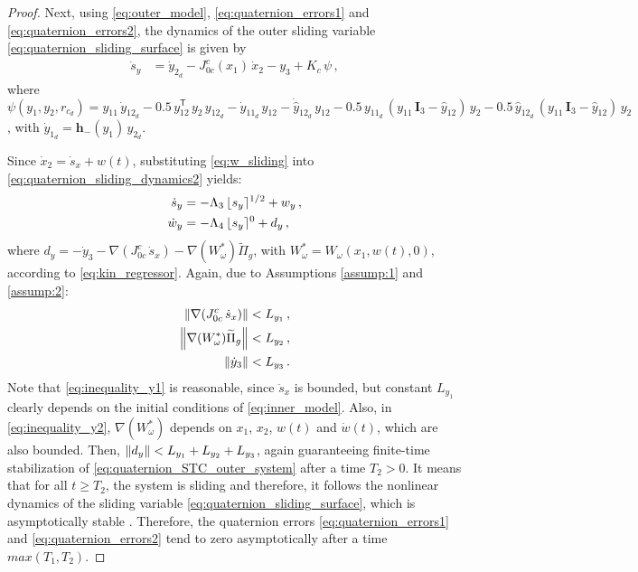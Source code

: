 \begin{proof}
Next, using \eqref{eq:outer_model}, \eqref{eq:quaternion_errors1} and \eqref{eq:quaternion_errors2}, the dynamics of the outer sliding variable \eqref{eq:quaternion_sliding_surface} is given by
%
\begin{align}
\dot{s}_{y} &= \dot{y}_{2_d} - J^{c}_{0c}(x_1) \, \dot{x}_2 - y_3 + K_{c} \, \psi \,,
\label{eq:quaternion_sliding_dynamics2}
\end{align}
%
where $\psi(y_1,y_2,r_{c_d}) = y_{11} \, \dot{y}_{12_d} - 0.5 \, y^\mathsf{T}_{12} \, y_{2} \, y_{12_d} - \dot{y}_{11_d} \, y_{12} - \dot{\widehat{y}}_{12_d} \, y_{12} - 0.5 \, y_{11_d} \, ( y_{11} \, \mathbf{I}_{3} - \widehat{y}_{12} ) \, y_{2} - 0.5 \, \widehat{y}_{12_d} \, ( y_{11} \, \mathbf{I}_{3} - \widehat{y}_{12} ) \, y_{2}$, 
with $\dot{y}_{1_d} = \mathbf{h}_-(y_1) \, y_{2_d}$.

Since $\dot{x}_2 = \dot{s}_x + w(t)$, substituting \eqref{eq:w_sliding} into \eqref{eq:quaternion_sliding_dynamics2} yields:
%
\begin{align}
\dot{s}_y &= - \Lambda_3 \, \lfloor s_y \rceil^{1/2} + w_y \,, \nonumber \\
\dot{w}_y &= - \Lambda_4 \, \lfloor s_y \rceil^{0} + d_y \,,
\label{eq:quaternion_STC_outer_system}
\end{align}
%
where $d_y = - \dot{y}_3 - \nabla( J^c_{0c} \, \dot{s}_x ) - \nabla( W^*_\omega ) \widetilde{\Pi}_g$, with $W^*_\omega = W_\omega (x_1, w(t), 0)$, according to \eqref{eq:kin_regressor}.
%
Again, due to Assumptions \ref{assump:1} and \ref{assump:2}:
%
\begin{align}
\left\lVert \nabla( J^c_{0c} \, \dot{s}_x ) \right\rVert &< L_{y_1} \,, \label{eq:inequality_y1} \\
\left\lVert \nabla( W^*_\omega ) \widetilde{\Pi}_g \right\rVert &< L_{y_2} \,, \label{eq:inequality_y2} \\
\left\lVert \dot{y}_3 \right\rVert &< L_{y_3} \label{eq:inequality_y3} \,.
\end{align}
%
Note that \eqref{eq:inequality_y1} is reasonable, since $\ddot{s}_x$ is bounded, but constant 
$L_{y_1}$ clearly depends on the initial conditions of \eqref{eq:inner_model}.
%
Also, in \eqref{eq:inequality_y2}, $\nabla( W^*_\omega )$ depends on $x_1$, $x_2$, $w(t)$ and $\dot{w}(t)$, which are also bounded.
%
Then, $\left\lVert d_y \right\rVert < L_{y_1} + L_{y_2} + L_{y_3}$, again guaranteeing finite-time stabilization of \eqref{eq:quaternion_STC_outer_system} after a time $T_2>0$.
%
It means that for all $t \ge T_2$, the system is sliding and therefore, it follows the nonlinear dynamics of the sliding variable \eqref{eq:quaternion_sliding_surface}, which is asymptotically stable \cite{Siciliano2009}.
%
Therefore, the quaternion errors \eqref{eq:quaternion_errors1} and \eqref{eq:quaternion_errors2} tend to zero asymptotically after a time $max(T_1,T_2)$.

\end{proof}


